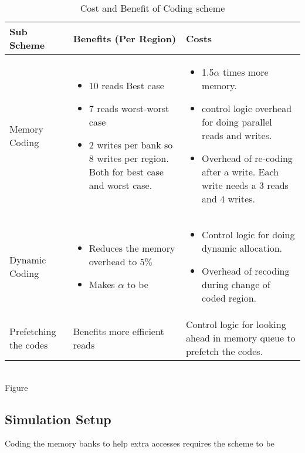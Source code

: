 \begin{table}[ht!]
    \begin{tabular}{ | p{2cm} | p{7.5cm} | p{7.5cm} |}
    \hline
    Sub Scheme & Benefits (Per Region) & Costs \\ \hline
    Memory Coding &
    \vspace{-7mm}  
    \begin{itemize} 
    \item 10 reads Best case 
    \item 7 reads worst-worst case
    \item 2 writes per bank so 8 writes per region. Both for best case and worst case.
    \end{itemize}
    & 
    \vspace{-7mm} 
    \begin{itemize} 
    \item 1.5$\alpha$ times more memory.  
    \item control logic overhead for doing parallel reads and writes.
    \item Overhead of re-coding after a write. Each write needs a 3 reads and 4 writes.  
    \end{itemize}
 \\ \hline
    Dynamic Coding & 
    \vspace{-7mm} 
    \begin{itemize}
    \item Reduces the memory overhead to 5$\%$
    \item Makes $\alpha$ to be 
    \end{itemize}
    & 
    \vspace{-7mm} 
    \begin{itemize}
    \item Control logic for doing dynamic allocation. 
    \item Overhead of recoding during change of coded region. 
    \end{itemize}
 \\ \hline 
    Prefetching the codes & 
    Benefits more efficient reads & 
    Control logic for looking ahead in memory queue to prefetch the codes. 
 \\ \hline
    \end{tabular}
    \caption{Cost and Benefit of Coding scheme}
    \label{table:benefit_cost}
\end{table}
\\
Figure

\subsection{Simulation Setup}
\label{sec:simulation_setup}
Coding the memory banks to help extra accesses requires the scheme to be 

